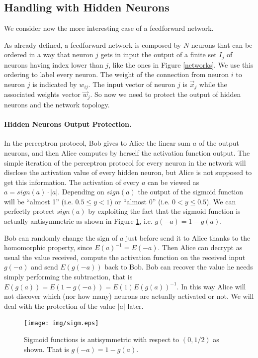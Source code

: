 \documentclass[11pt,oribibl,runningheads]{llncs}
\begin{document}
\subsection{Handling with Hidden Neurons}
We consider now the more interesting case of a feedforward network.

As already defined, a feedforward network is composed by $N$ neurons
that can be ordered in a way that neuron $j$ gets in input the
output of a finite set $I_j$ of neurons having index lower than $j$,
like the ones in Figure \ref{networks}. We use this ordering to
label every neuron. The weight of the connection from neuron $i$ to
neuron $j$ is indicated by $w_{ij}$. The input vector of neuron $j$
is $\vec{x}_j$ while the associated weights vector $\vec{w}_j$. So now we need to protect the output of hidden neurons and the network topology.

\paragraph{Hidden Neurons Output Protection.} In the perceptron
protocol, Bob gives to Alice the linear sum $a$ of the output
neurons, and then Alice computes by herself the activation
function output. The simple iteration of the perceptron protocol
for every neuron in the network will disclose the activation
value of every hidden neuron, but Alice is not supposed to get
this information. The activation of every $a$ can be viewed as
$a=sign(a)\cdot |a|$. Depending on $sign(a)$ the output of the
sigmoid function will be ``almost 1'' (i.e. $0.5 \leq y < 1$) or
``almost 0'' (i.e. $0 < y \leq 0.5$). We can perfectly protect
$sign(a)$ by exploiting the fact that the sigmoid function is
actually antisymmetric as shown in Figure \ref{sigmoid}, i.e.
$g(-a)=1-g(a)$.

Bob can randomly change the sign of $a$ just before send it to
Alice thanks to the homomorphic property, since $E(a)^{-1}=E(-a)$.
Then Alice can decrypt as usual the value received, compute the
activation function on the received input $g(-a)$ and send
$E(g(-a))$ back to Bob. Bob can recover the value he needs simply
performing the subtraction, that is
$E(g(a))=E(1-g(-a))=E(1)E(g(a))^{-1}$. In this way Alice will not
discover which (nor how many) neurons are actually activated or not. We will deal
with the protection of the value $|a|$ later.

\begin{figure}
\centering
 \texttt{[image: img/sigm.eps]} \\
\caption{Sigmoid functions is antisymmetric with respect to
$(0,1/2)$ as shown. That is $g(-a)=1-g(a)$.}
%
\label{sigmoid}
\end{figure}
\end{document}
